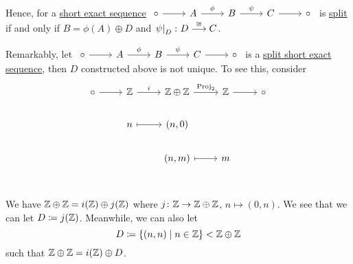 \begin{remark}
	Hence, for a \hyperref[def:short-exact-sequence]{short exact sequence} \(\begin{tikzcd}
		\circ & A & B & C & \circ
		\arrow["\phi ", from=1-2, to=1-3]
		\arrow["\psi", from=1-3, to=1-4]
		\arrow[from=1-1, to=1-2]
		\arrow[from=1-4, to=1-5]
	\end{tikzcd}\) is \hyperref[def:split-short-exact-sequence]{split} if and only if \(B = \phi (A)\hyperref[def:internal-direct-sum]{\oplus} D\) and \(\left.\psi \right\vert_{D}^{}\colon D \overset{\cong}{\longrightarrow} C \).

	Remarkably, let \(\begin{tikzcd}
		\circ & A & B & C & \circ
		\arrow["\phi ", from=1-2, to=1-3]
		\arrow["\psi", from=1-3, to=1-4]
		\arrow[from=1-1, to=1-2]
		\arrow[from=1-4, to=1-5]
	\end{tikzcd}\) is a \hyperref[def:split-short-exact-sequence]{split short exact sequence}, then \(D\) constructed above is not unique. To see this, consider
	\[\begin{tikzcd}
			\circ & \mathbb{\MakeUppercase{z}} & {\mathbb{\MakeUppercase{z}}\oplus \mathbb{\MakeUppercase{z}}  } & \mathbb{\MakeUppercase{z}} & \circ \\
			& n & {(n, 0)} \\
			& & {(n, m)} & {m} \\
			\arrow["i", from=1-2, to=1-3]
			\arrow["{\mathrm{Proj}_2}", from=1-3, to=1-4]
			\arrow[from=1-1, to=1-2]
			\arrow[from=1-4, to=1-5]
			\arrow[maps to, from=2-2, to=2-3]
			\arrow[maps to, from=3-3, to=3-4]
		\end{tikzcd}\]
	We have \(\mathbb{\MakeUppercase{z}} \oplus \mathbb{\MakeUppercase{z}} = i(\mathbb{\MakeUppercase{z}} )\oplus j(\mathbb{\MakeUppercase{z}} )\) where \(j\colon \mathbb{\MakeUppercase{z}} \to \mathbb{\MakeUppercase{z}} \oplus \mathbb{\MakeUppercase{z}} \),
	\(n\mapsto (0,n)\). We see that we can let \(D\coloneqq j(\mathbb{\MakeUppercase{z}} )\). Meanwhile, we can also let
	\[
		D \coloneqq \left\{(n, n)\mid n\in \mathbb{\MakeUppercase{z}} \right\}< \mathbb{\MakeUppercase{z}} \oplus\mathbb{\MakeUppercase{z}}
	\]
	such that \(\mathbb{\MakeUppercase{z}} \oplus\mathbb{\MakeUppercase{z}}  = i(\mathbb{\MakeUppercase{z}} )\oplus D\).
\end{remark}

